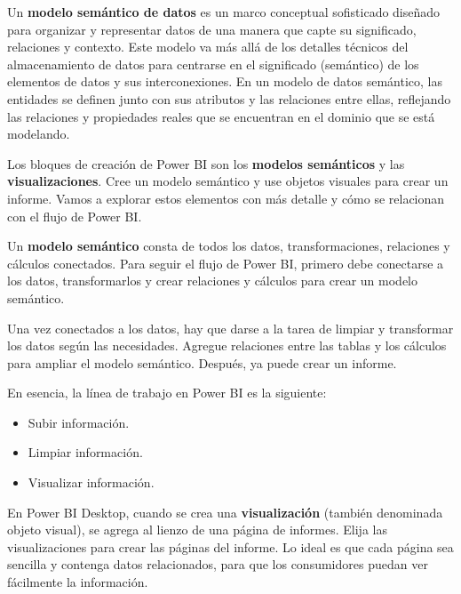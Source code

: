 \documentclass[12pt]{report}
\newcounter{it}
\theoremstyle{largebreak}
\begin{document}
    \begin{mydef}
      Un \textbf{modelo semántico de datos} es un marco conceptual sofisticado diseñado para organizar y representar datos de una manera que capte su significado, relaciones y contexto.
      Este modelo va más allá de los detalles técnicos del almacenamiento de datos para centrarse en el significado (semántico) de los elementos de datos y sus interconexiones.
      En un modelo de datos semántico, las entidades se definen junto con sus atributos y las relaciones entre ellas, reflejando las relaciones y propiedades reales que se encuentran en el dominio que se está modelando.
    \end{mydef}

    Los bloques de creación de Power BI son los \textbf{modelos semánticos} y las \textbf{visualizaciones}. Cree un modelo semántico y use objetos visuales para crear un informe. Vamos a explorar estos elementos con más detalle y cómo se relacionan con el flujo de Power BI.

    Un \textbf{modelo semántico} consta de todos los datos, transformaciones, relaciones y cálculos conectados. Para seguir el flujo de Power BI, primero debe conectarse a los datos, transformarlos y crear relaciones y cálculos para crear un modelo semántico.

    \begin{obs}
      Una vez conectados a los datos, hay que darse a la tarea de limpiar y transformar los datos según las necesidades. Agregue relaciones entre las tablas y los cálculos para ampliar el modelo semántico. Después, ya puede crear un informe.
    \end{obs}

    \begin{obs}
      En esencia, la línea de trabajo en Power BI es la siguiente:
      \begin{itemize}
        \item Subir información.
        \item Limpiar información.
        \item Visualizar información.
      \end{itemize}
    \end{obs}

    En Power BI Desktop, cuando se crea una \textbf{visualización} (también denominada objeto visual), se agrega al lienzo de una página de informes. Elija las visualizaciones para crear las páginas del informe. Lo ideal es que cada página sea sencilla y contenga datos relacionados, para que los consumidores puedan ver fácilmente la información.
\end{document}
